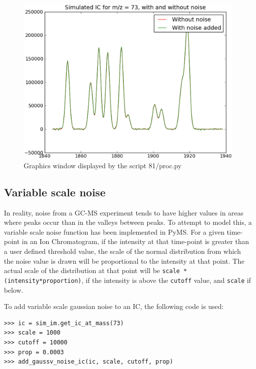 \begin{figure}[h]
  \begin{center}
    \includegraphics[scale=0.25]{graphics/chapter10/test-81.eps}
  \end{center}
  \caption{Graphics window displayed by the script 81/proc.py}
  \label{fig:gaussc-noise-ic}
\end{figure}


\subsection{Variable scale noise}
\label{subsec:gaussv-noise-ic}


In reality, noise from a GC-MS experiment tends to have higher values in areas where peaks occur than in
the valleys between peaks. To attempt to model this, a variable scale noise function has been implemented in
PyMS. For a given time-point in an Ion Chromatogram, if the intensity at that time-point is greater than
a user defined threshold value, the scale of the normal distribution from which the noise value is drawn will be 
proportional to the intensity at that point. The actual scale of the distribution at that point will be
{\tt scale * (intensity*proportion)}, if the intensity is above the {\tt cutoff} value, and {\tt scale} if below.

To add variable scale gaussian noise to an IC, the following code is used:

\begin{verbatim}
>>> ic = sim_im.get_ic_at_mass(73)
>>> scale = 1000
>>> cutoff = 10000
>>> prop = 0.0003
>>> add_gaussv_noise_ic(ic, scale, cutoff, prop)
\end{verbatim}

